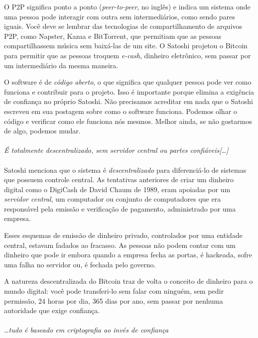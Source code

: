 O P2P significa ponto a ponto (\textit{peer-to-peer}, no inglês) e indica um sistema onde uma pessoa pode interagir com outra sem intermediários, como sendo pares iguais. Você deve se lembrar das tecnologias de compartilhamento de arquivos P2P, como Napster, Kazaa e BitTorrent, que permitiam que as pessoas compartilhassem música sem baixá-las de um site. O Satoshi projetou o Bitcoin para permitir que as pessoas troquem \textit{e-cash}, dinheiro eletrônico, sem passar por um intermediário da mesma maneira.

O software é de \textit{código aberto}, o que significa que qualquer pessoa pode ver como funciona e contribuir para o projeto. Isso é importante porque elimina a exigência de confiança no próprio Satoshi. Não precisamos acreditar em nada que o Satoshi escreveu em sua postagem sobre como o software funciona. Podemos olhar o código e verificar como ele funciona nós mesmos. Melhor ainda, se não gostarmos de algo, podemos mudar.
\paragraph{}
\textit{É totalmente descentralizado, sem servidor central ou partes confiáveis[\ldots]}
\paragraph{}
Satoshi menciona que o sistema é \textit{descentralizado} para diferenciá-lo de sistemas que possuem controle central. As tentativas anteriores de criar um dinheiro digital como o DigiCash de David Chaum de 1989, eram apoiadas por um \textit{servidor central}, um computador ou conjunto de computadores que era responsável pela emissão e verificação de pagamento, administrado por uma empresa.

Esses esquemas de emissão de dinheiro privado, controlados por uma entidade central, estavam fadados ao fracasso. As pessoas não podem contar com um dinheiro que pode ir embora quando a empresa fecha as portas, é hackeada, sofre uma falha no servidor ou, é fechada pelo governo.

A natureza descentralizada do Bitcoin traz de volta o conceito de dinheiro para o mundo digital: você pode transferi-lo sem falar com ninguém, sem pedir permissão, 24 horas por dia, 365 dias por ano, sem passar por nenhuma autoridade que exige confiança.
\paragraph{}
\textit{\dots tudo é baseado em criptografia ao invés de confiança}
